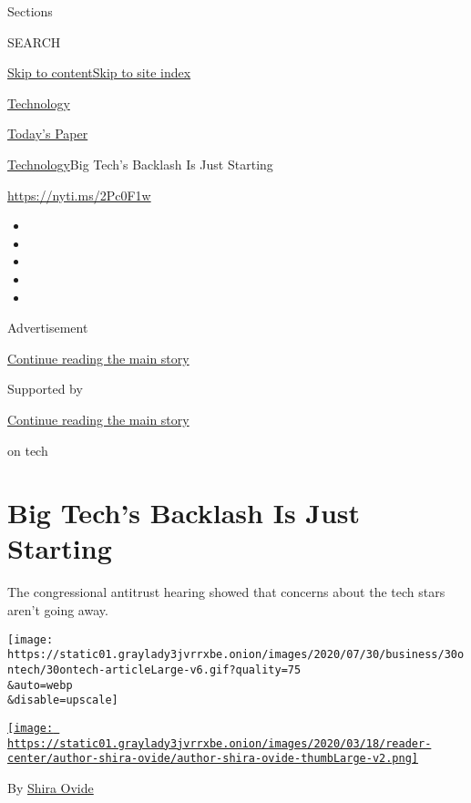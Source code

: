 Sections

SEARCH

\protect\hyperlink{site-content}{Skip to
content}\protect\hyperlink{site-index}{Skip to site index}

\href{https://www.nytimes3xbfgragh.onion/section/technology}{Technology}

\href{https://myaccount.nytimes3xbfgragh.onion/auth/login?response_type=cookie\&client_id=vi}{}

\href{https://www.nytimes3xbfgragh.onion/section/todayspaper}{Today's
Paper}

\href{/section/technology}{Technology}\textbar{}Big Tech's Backlash Is
Just Starting

\url{https://nyti.ms/2Pc0F1w}

\begin{itemize}
\item
\item
\item
\item
\item
\end{itemize}

Advertisement

\protect\hyperlink{after-top}{Continue reading the main story}

Supported by

\protect\hyperlink{after-sponsor}{Continue reading the main story}

on tech

\hypertarget{big-techs-backlash-is-just-starting}{%
\section{Big Tech's Backlash Is Just
Starting}\label{big-techs-backlash-is-just-starting}}

The congressional antitrust hearing showed that concerns about the tech
stars aren't going away.

\texttt{[image: https://static01.graylady3jvrrxbe.onion/images/2020/07/30/business/30ontech/30ontech-articleLarge-v6.gif?quality=75\\\&auto=webp\\\&disable=upscale]}

\href{https://www.nytimes3xbfgragh.onion/by/shira-ovide}{\texttt{[image: https://static01.graylady3jvrrxbe.onion/images/2020/03/18/reader-center/author-shira-ovide/author-shira-ovide-thumbLarge-v2.png]}}

By \href{https://www.nytimes3xbfgragh.onion/by/shira-ovide}{Shira Ovide}


